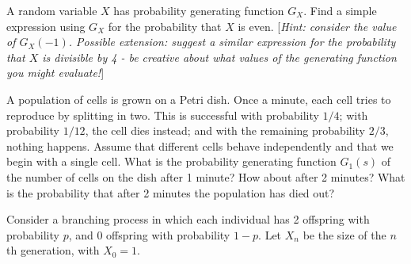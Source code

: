 \documentclass[answers]{exam}
\begin{document}
\begin{questions}



\question%
A random variable $X$ has probability generating function $G_{X}$. Find a simple expression using $G_{X}$ for the probability that $X$ is even. [\emph{Hint: consider the value of $G_{X}(-1)$. Possible extension: suggest a similar expression for the probability that $X$ is divisible by 4 - be creative about what values of the generating function you might evaluate!}]



\question%
A population of cells is grown on a Petri dish. Once a minute, each cell tries to reproduce by splitting in two. This is successful with probability $1 / 4$; with probability $1 / 12$, the cell dies instead; and with the remaining probability $2 / 3$, nothing happens. Assume that different cells behave independently and that we begin with a single cell. What is the probability generating function $G_1(s)$ of the number of cells on the dish after 1 minute? How about after 2 minutes? What is the probability that after 2 minutes the population has died out?



\question%
Consider a branching process in which each individual has 2 offspring with probability $p$, and 0 offspring with probability $1-p$. Let $X_{n}$ be the size of the $n$th generation, with $X_{0}=1$.
\end{questions}
\end{document}
